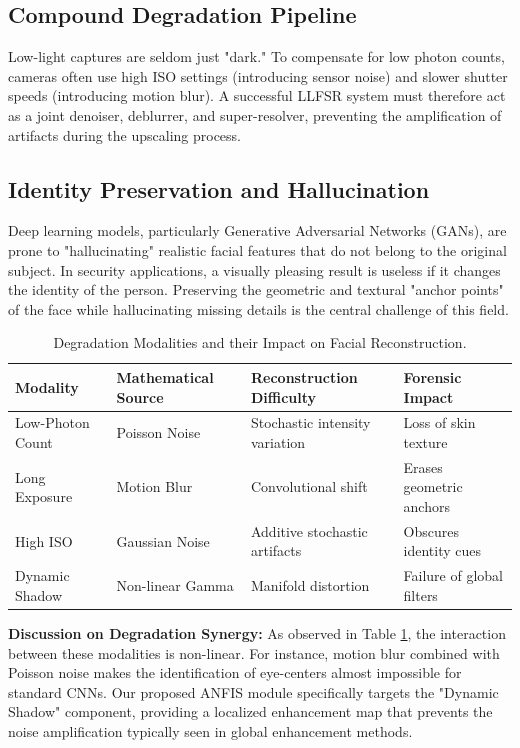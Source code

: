 \subsection{Compound Degradation Pipeline}
Low-light captures are seldom just "dark." To compensate for low photon counts, cameras often use high ISO settings (introducing sensor noise) and slower shutter speeds (introducing motion blur). A successful LLFSR system must therefore act as a joint denoiser, deblurrer, and super-resolver, preventing the amplification of artifacts during the upscaling process.

\subsection{Identity Preservation and Hallucination}
Deep learning models, particularly Generative Adversarial Networks (GANs), are prone to "hallucinating" realistic facial features that do not belong to the original subject. In security applications, a visually pleasing result is useless if it changes the identity of the person. Preserving the geometric and textural "anchor points" of the face while hallucinating missing details is the central challenge of this field.

\begin{table}[htbp]
    \centering
    \caption{Degradation Modalities and their Impact on Facial Reconstruction.}
    \label{tab:degradation_impact}
    \begin{tabular}{lp{3cm}p{4cm}p{4cm}}
        \toprule
        \textbf{Modality} & \textbf{Mathematical Source} & \textbf{Reconstruction Difficulty} & \textbf{Forensic Impact} \\
        \midrule
        Low-Photon Count & Poisson Noise & Stochastic intensity variation & Loss of skin texture \\
        Long Exposure & Motion Blur & Convolutional shift & Erases geometric anchors \\
        High ISO & Gaussian Noise & Additive stochastic artifacts & Obscures identity cues \\
        Dynamic Shadow & Non-linear Gamma & Manifold distortion & Failure of global filters \\
        \bottomrule
    \end{tabular}
\end{table}

\textbf{Discussion on Degradation Synergy:} As observed in Table \ref{tab:degradation_impact}, the interaction between these modalities is non-linear. For instance, motion blur combined with Poisson noise makes the identification of eye-centers almost impossible for standard CNNs. Our proposed ANFIS module specifically targets the "Dynamic Shadow" component, providing a localized enhancement map that prevents the noise amplification typically seen in global enhancement methods.

